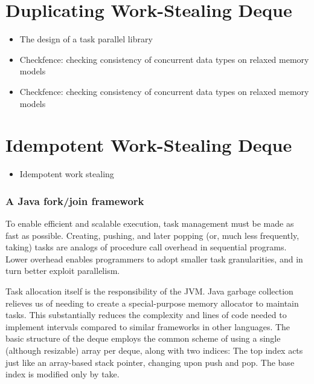 \section{Duplicating Work-Stealing Deque}
\label{sec:queues-implementation-duplicating-ws-deque}

\begin{itemize}
\item The design of a task parallel library \cite{Leijen2009}
\item Checkfence: checking consistency of concurrent data types on
  relaxed memory models \cite{Burckhardt2007}
\item Checkfence: checking consistency of concurrent data types on
  relaxed memory models \cite{Burckhardt2007a}
\end{itemize}




\section{Idempotent Work-Stealing Deque}
\label{sec:queues-implementation-idempotent-ws-deque}

\begin{itemize}
\item Idempotent work stealing \cite{Michael2009}
\end{itemize}



\subsubsection{A Java fork/join framework \cite{Lea2000}}


To enable efficient and scalable execution, task management must be
made as fast as possible. Creating, pushing, and later popping (or,
much less frequently, taking) tasks are analogs of procedure call
overhead in sequential programs. Lower overhead enables programmers to
adopt smaller task granularities, and in turn better exploit
parallelism.

Task allocation itself is the responsibility of the JVM. Java garbage
collection relieves us of needing to create a special-purpose memory
allocator to maintain tasks. This substantially reduces the complexity
and lines of code needed to implement intervals compared to similar
frameworks in other languages. The basic structure of the deque
employs the common scheme of using a single (although resizable) array
per deque, along with two indices: The top index acts just like an
array-based stack pointer, changing upon push and pop. The base index
is modified only by take.

